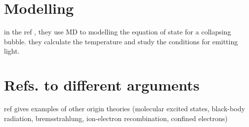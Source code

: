 \documentclass[rmp,aps,nofootinbib,superscriptaddress,floatfix]{revtex4-2}
\begin{document}
\section{Modelling}
in the ref \cite{schanz2012molecular}, they use MD to modelling the equation of state for a collapsing bubble. they calculate the temperature and study the conditions for emitting light.

\section{Refs. to different arguments}
ref \cite{didenko2000molecular} gives examples of other origin theories (molecular excited states, black-body radiation, bremsstrahlung, ion-electron recombination, confined electrons)




\end{document}
